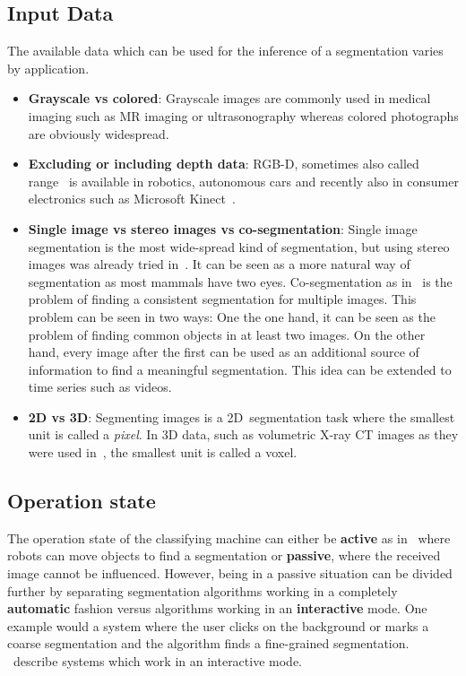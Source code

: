 \goodbreak
\subsection{Input Data}\label{subsec:input-data}
The available data which can be used for the inference of a segmentation varies
by application.

\begin{itemize}
    \item \textbf{Grayscale vs colored}: Grayscale images are commonly used in
          medical imaging such as \gls{MR} imaging or ultrasonography whereas
          colored photographs are obviously widespread.
    \item \textbf{Excluding or including depth data}: RGB-D, sometimes also
          called range~\cite{hoover1996experimental} is available in robotics,
          autonomous cars and recently also in consumer electronics such as
          Microsoft Kinect~\cite{6190806}.
    \item \textbf{Single image vs stereo images vs co-segmentation}: Single
          image segmentation is the most wide-spread kind of segmentation, but
          using stereo images was already tried in~\cite{boykov2001fast}. It
          can be seen as a more natural way of segmentation as most mammals
          have two eyes.
          Co-segmentation as in~\cite{1640859,collins2012random} is the problem
          of finding a consistent segmentation for multiple images. This problem
          can be seen in two ways: One the one hand, it can be seen as the problem
          of finding common objects in at least two images. On the other hand,
          every image after the first can be used as an additional source of
          information to find a meaningful segmentation. This idea can be
          extended to time series such as videos.
    \item \textbf{2D vs 3D}: Segmenting images is a 2D~segmentation task where
          the smallest unit is called a \textit{pixel}. In 3D data, such as
          volumetric X-ray CT images as they were used in~\cite{929615}, the
          smallest unit is called a voxel.
\end{itemize}


\subsection{Operation state}\label{subsec:operation-state}
The operation state of the classifying machine can either be \textbf{active} as
in~\cite{schiebener2011segmentation,schiebener2012discovery} where robots can
move objects to find a segmentation or \textbf{passive}, where the received
image cannot be influenced. However, being in a passive situation can be
divided further by separating segmentation algorithms working in a completely
\textbf{automatic} fashion versus algorithms working in an \textbf{interactive}
mode. One example would a system where the user clicks on the background or
marks a coarse segmentation and the algorithm finds a fine-grained
segmentation.
\cite{boykov2000interactive,rother2004grabcut,protiere2007interactive}~describe
systems which work in an interactive mode.

